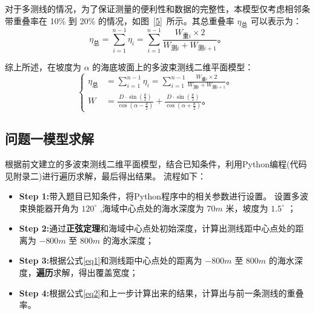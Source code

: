 \documentclass[withoutpreface,bwprint]{cumcmthesis} %
\begin{document}
    
    对于多测线的情况，为了保证测量的便利性和数据的完整性，本模型仅考虑相邻条带重叠率在 10\% 到 20\% 的情况，如图~\ref{5}~所示。其总重叠率 $\eta_\text{总}$ 可以表示为：
    \begin{equation}
        \eta_\text{总} = \sum_{i=1}^{n-1} \eta_i = \sum_{i=1}^{n-1} \frac{W_{\text{重}i} \times 2}{W_{\text{测}i} + W_{\text{测}i+1}} \text{。}
    \end{equation}

    综上所述，在坡度为 $\alpha$ 的海底坡面上的多波束测线二维平面模型：
    \begin{equation}
        \left\{
        \begin{aligned}
        \eta_\text{总} &= \sum_{i=1}^{n-1} \eta_i = \sum_{i=1}^{n-1} \frac{W_{\text{重}i} \times 2}{W_{\text{测}i} + W_{\text{测}i+1}} \text{。} \\
        W &= \frac{D \cdot \sin\left(\frac{\theta}{2}\right)}{\cos\left(\alpha - \frac{\theta}{2}\right)} + \frac{D \cdot \sin\left(\frac{\theta}{2}\right)}{\cos\left(\alpha + \frac{\theta}{2}\right)} \text{。}
        \end{aligned}
        \right.
    \end{equation}

    \subsection{问题一模型求解}
    根据前文建立的多波束测线二维平面模型，结合已知条件，利用Python编程(代码见附录二)进行遍历求解，最后得出结果。
    流程如下：
    \begin{itemize}
        \item \textbf{Step 1:}带入题目已知条件，将Python程序中的相关参数进行设置。
        设置多波束换能器开角为 $120^\circ$ ,海域中心点处的海水深度为 $70m$ 米，坡度为 $1.5^\circ$ ；
        \item \textbf{Step 2:}通过\textbf{正弦定理}和海域中心点处初始深度，计算出测线距中心点处的距离为 $-800m$ 至 $800m$ 的海水深度；
        \item \textbf{Step 3:}根据公式\ref{eq1}和测线距中心点处的距离为 $-800m$ 至 $800m$ 的海水深度，\textbf{遍历}求解，得出覆盖宽度；
        \item \textbf{Step 4:}根据公式\ref{eq2}和上一步计算出来的结果，计算出与前一条测线的重叠率。
    \end{itemize}
    
\end{document}
